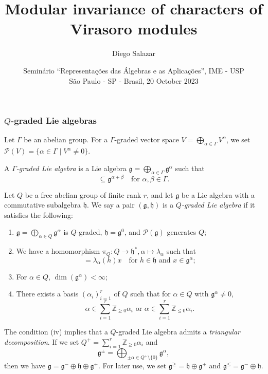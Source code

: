 \documentclass{beamer}
\title[Modular inv.\ of char.\ of Virasoro modules]{Modular invariance of characters of Virasoro modules}
\author[Salazar]{Diego Salazar\inst{1}}
\institute[IMPA]{\inst{1} Instituto de Matemática Pura e Aplicada (IMPA)}
\date[20 October 2023]{Seminário ``Representações das Álgebras e as Aplicações'', IME - USP \\
  São Paulo - SP - Brasil, 20 October 2023}
\begin{document}
\maketitle

\begin{frame}
  \frametitle{$Q$-graded Lie algebras}
  Let $\Gamma$ be an abelian group.
  For a $\Gamma$-graded vector space $V = \bigoplus_{\alpha \in \Gamma}V^{\alpha}$, we set $\mathcal{P}(V) = \{\alpha \in \Gamma \mid V^{\alpha} \neq 0\}$.

  A \emph{$\Gamma$-graded Lie algebra} is a Lie algebra $\mathfrak{g} = \bigoplus_{\alpha \in \Gamma}\mathfrak{g}^{\alpha}$ such that
  \begin{equation*}
    [\mathfrak{g}^{\alpha}, \mathfrak{g}^{\beta}] \subseteq \mathfrak{g}^{\alpha + \beta} \quad \text{for $\alpha, \beta \in \Gamma$}.
  \end{equation*}

  Let $Q$ be a free abelian group of finite rank $r$, and let $\mathfrak{g}$ be a Lie algebra with a commutative subalgebra $\mathfrak{h}$.
  We say a pair $(\mathfrak{g}, \mathfrak{h})$ is a \emph{$Q$-graded Lie algebra} if it satisfies the following:
  \begin{enumerate}
  \item $\mathfrak{g} = \bigoplus_{\alpha \in Q}\mathfrak{g}^{\alpha}$ is $Q$-graded, $\mathfrak{h} = \mathfrak{g}^0$, and $\mathcal{P}(\mathfrak{g})$ generates $Q$;
  \item We have a homomorphism $\pi_Q: Q \to \mathfrak{h}^*, \alpha \mapsto \lambda_{\alpha}$ such that
    \begin{equation*}
      [h, x] = \lambda_{\alpha}(h)x \quad \text{for $h \in \mathfrak{h}$ and $x \in \mathfrak{g}^{\alpha}$};
    \end{equation*}
  \item For $\alpha \in Q$, $\dim(\mathfrak{g}^{\alpha}) < \infty$;
  \item There exists a basis $(\alpha_i)_{i = 1}^r$ of $Q$ such that for $\alpha \in Q$ with $\mathfrak{g}^{\alpha} \neq 0$,
    \begin{equation*}
      \text{$\alpha \in \sum_{i = 1}^r\mathbb{Z}_{\ge 0}\alpha_i$ or $\alpha \in \sum_{i = 1}^r\mathbb{Z}_{\le 0}\alpha_i$}.
    \end{equation*}
  \end{enumerate}
\end{frame}

\begin{frame}
  The condition (iv) implies that a $Q$-graded Lie algebra admits a \emph{triangular decomposition}.
  If we set $Q^+ = \sum_{i = 1}^r\mathbb{Z}_{\ge 0}\alpha_i$ and
  \begin{equation*}
    \mathfrak{g}^{\pm} = \bigoplus_{\pm \alpha \in Q^+ \setminus \{0\}}\mathfrak{g}^{\alpha},
  \end{equation*}
  then we have $\mathfrak{g} = \mathfrak{g}^- \oplus \mathfrak{h} \oplus \mathfrak{g}^+$.
  For later use, we set $\mathfrak{g}^{\ge} = \mathfrak{h} \oplus \mathfrak{g}^+$ and $\mathfrak{g}^{\le} = \mathfrak{g}^- \oplus \mathfrak{h}$.
\end{frame}
\end{document}
